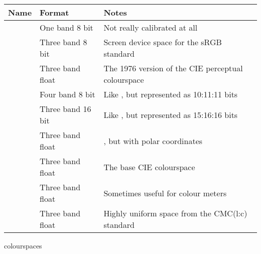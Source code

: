 \begin{tab2}
\begin{center}
\begin{tabular}{||l|l|l||}
\hline
Name & Format & Notes \\
\hline
\ct{Mono} & One band 8 bit & 
	Not really calibrated at all \\
\ct{sRGB} & Three band 8 bit & 
	Screen device space for the sRGB standard \\
\ct{Lab} & Three band float & 
	The 1976 version of the CIE perceptual colourspace \\
\ct{LabQ} & Four band 8 bit & 
	Like \ct{Lab}, but represented as 10:11:11 bits \\
\ct{LabS} & Three band 16 bit & 
	Like \ct{Lab}, but represented as 15:16:16 bits \\
\ct{LCh} & Three band float & 
	\ct{Lab}, but with polar coordinates \\
\ct{XYZ} & Three band float & 
	The base CIE colourspace \\
\ct{Yxy} & Three band float & 
	Sometimes useful for colour meters \\
\ct{UCS} & Three band float & 
	Highly uniform space from the CMC(l:c) standard \\
\hline
\end{tabular}
\end{center}
\caption{\nip{} colourspaces}
\end{tab2}

